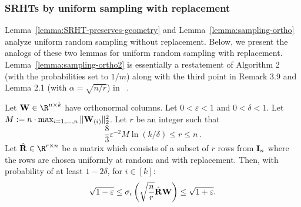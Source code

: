 \subsubsection{SRHTs by uniform sampling with replacement}
Lemma~\ref{lemma:SRHT-preserves-geometry} and Lemma~\ref{lemma:sampling-ortho} analyze uniform random
sampling without replacement. Below, we present the analogs of these two lemmas for uniform random sampling with replacement.
Lemma~\ref{lemma:sampling-ortho2} is essentially a restatement of Algorithm 2 (with the probabilities set to $1/m$)
along with the third point in Remark 3.9 and Lemma 2.1 (with $\alpha=\sqrt{n/r}$) in~ \cite{IW12}.
\begin{lemma}
\label{lemma:sampling-ortho2}
Let $\matW \in \R^{n \times k}$ have orthonormal columns.
Let $0 < \varepsilon < 1$ and $0 < \delta < 1$. Let $ M:= n \cdot \max\nolimits_{i=1,...,n} \mbox{}\|{\bm{\mathrm{W}}}_{(i)}\|_2^2$.
Let $r$ be an integer such that
\begin{equation}\label{eqn:r3v2}
\frac{8}{3} \varepsilon^{-2} M \ln (k/\delta) \leq r \leq n \,.
\end{equation}
Let $\hat\matR \in \R^{r \times n}$ be a matrix which consists of a subset of $r$ rows from ${\bm{\mathrm{I}}}_n$
where the rows are  chosen uniformly at random and with replacement.
Then, with probability of at least $1-2\delta$, for $i\in[k]$:
$$ \sqrt{1-\varepsilon} \le \sigma_i\left( \sqrt{{n\over r}} \hat{{\bm{\mathrm{R}}}} {\bm{\mathrm{W}}} \right) \le  \sqrt{1+\varepsilon} .$$
\end{lemma}


